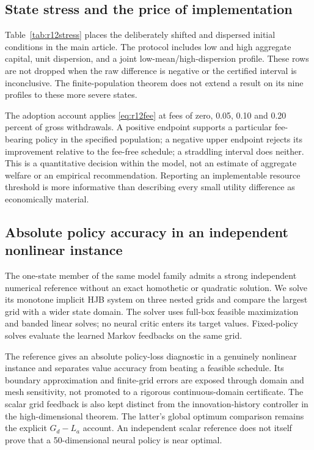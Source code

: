 \subsection{State stress and the price of implementation}
Table~\ref{tab:r12stress} places the deliberately shifted and dispersed initial conditions in the main article. The protocol includes low and high aggregate capital, unit dispersion, and a joint low-mean/high-dispersion profile. These rows are not dropped when the raw difference is negative or the certified interval is inconclusive. The finite-population theorem does not extend a result on its nine profiles to these more severe states.




The adoption account applies \eqref{eq:r12fee} at fees of zero, 0.05, 0.10 and 0.20 percent of gross withdrawals. A positive endpoint supports a particular fee-bearing policy in the specified population; a negative upper endpoint rejects its improvement relative to the fee-free schedule; a straddling interval does neither. This is a quantitative decision within the model, not an estimate of aggregate welfare or an empirical recommendation. Reporting an implementable resource threshold is more informative than describing every small utility difference as economically material.

\subsection{Absolute policy accuracy in an independent nonlinear instance}
The one-state member of the same model family admits a strong independent numerical reference without an exact homothetic or quadratic solution. We solve its monotone implicit HJB system on three nested grids and compare the largest grid with a wider state domain. The solver uses full-box feasible maximization and banded linear solves; no neural critic enters its target values. Fixed-policy solves evaluate the learned Markov feedbacks on the same grid.



The reference gives an absolute policy-loss diagnostic in a genuinely nonlinear instance and separates value accuracy from beating a feasible schedule. Its boundary approximation and finite-grid errors are exposed through domain and mesh sensitivity, not promoted to a rigorous continuous-domain certificate. The scalar grid feedback is also kept distinct from the innovation-history controller in the high-dimensional theorem. The latter's global optimum comparison remains the explicit $G_d-L_a$ account. An independent scalar reference does not itself prove that a 50-dimensional neural policy is near optimal.

